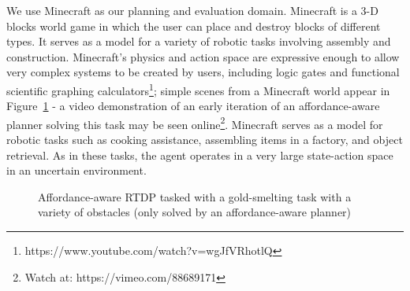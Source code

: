 \documentclass[conference]{IEEEtran}
\begin{document}
We use Minecraft as our planning and evaluation domain. Minecraft is a
3-D blocks world game in which the user can place and destroy blocks
of different types.   It serves as a model for a variety of robotic tasks involving assembly and construction.  Minecraft's physics and action space are expressive
enough to allow very complex systems to be created by users, including logic gates and 
functional scientific graphing calculators\footnote{https://www.youtube.com/watch?v=wgJfVRhotlQ};
simple scenes from a Minecraft world appear in Figure~\ref{fig:epicworld} - a video demonstration of
an early iteration of an affordance-aware planner solving this task may be seen online\footnote{Watch at: https://vimeo.com/88689171}.
Minecraft serves as a model for robotic tasks such as cooking assistance, assembling items in a factory, 
and object retrieval.  As in these tasks, the agent operates in a very large state-action space in an uncertain environment.

\begin{figure}
\centering
{}%
%
%
%
  \caption{Affordance-aware RTDP tasked with a gold-smelting task with a variety of obstacles
  (only solved by an affordance-aware planner)}
  \label{fig:epicworld}
\end{figure}
\end{document}
